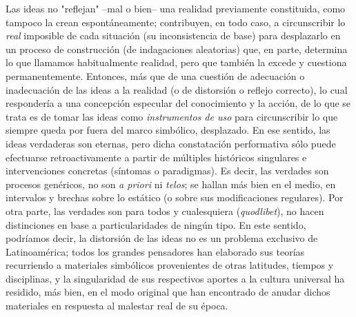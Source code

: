 \documentclass{book}
\begin{document}
Las ideas no "reflejan" --mal o bien-- una realidad previamente
constituida, como tampoco la crean espontáneamente; contribuyen, en todo
caso, a circunscribir lo \emph{real} imposible de cada situación (su
inconsistencia de base) para desplazarlo en un proceso de construcción
(de indagaciones aleatorias) que, en parte, determina lo que llamamos
habitualmente realidad, pero que también la excede y cuestiona
permanentemente. Entonces, más que de una cuestión de adecuación o
inadecuación de las ideas a la realidad (o de distorsión o reflejo
correcto), lo cual respondería a una concepción especular del
conocimiento y la acción, de lo que se trata es de tomar las ideas como
\emph{instrumentos de uso} para circunscribir lo que siempre queda por
fuera del marco simbólico, desplazado. En ese sentido, las ideas
verdaderas son eternas, pero dicha constatación performativa sólo puede
efectuarse retroactivamente a partir de múltiples históricos singulares
e intervenciones concretas (síntomas o paradigmas). Es decir, las
verdades son procesos genéricos, no son \emph{a priori} ni \emph{telos};
se hallan más bien en el medio, en intervalos y brechas sobre lo
estático (o sobre sus modificaciones regulares). Por otra parte, las
verdades son para todos y cualesquiera (\emph{quodlibet}), no hacen
distinciones en base a particularidades de ningún tipo. En este sentido,
podríamos decir, la distorsión de las ideas no es un problema exclusivo
de Latinoamérica; todos los grandes pensadores han elaborado sus teorías
recurriendo a materiales simbólicos provenientes de otras latitudes,
tiempos y disciplinas, y la singularidad de sus respectivos aportes a la
cultura universal ha residido, más bien, en el modo original que han
encontrado de anudar dichos materiales en respuesta al malestar real de
su época.
\end{document}
